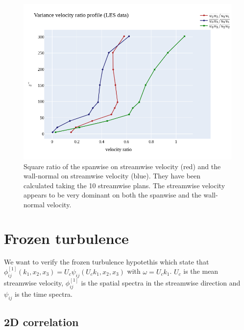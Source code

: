 \documentclass[]{article}
\theoremstyle{plain}
\theoremstyle{remark}
\begin{document}
\begin{figure}[H]
	\begin{center}
	\includegraphics[width=\textwidth]{../../output/figures/channel_wrles_retau395/split_time/RANS/velocity_ratio_profiles_all.png}
	\caption{Square ratio of the spanwise on streamwise velocity (red) and the wall-normal on streamwise velocity (blue). They have been calculated taking the 10 streamwise plans. The streamwise velocity appears to be very dominant on both the spanwise and the wall-normal velocity.}
	\end{center}
\end{figure}



\section{Frozen turbulence}

We want to verify the frozen turbulence hypotethis which state that $\phi_{ij}^{[1]}(k_1,x_2,x_3)=U_c\psi_{ij}(U_ck_1,x_2,x_3)$ with $\omega=U_ck_1$. $U_c$ is the mean streamwise velocity, $\phi_{ij}^{[1]}$ is the spatial spectra in the streamwise direction and $\psi_{ij}$ is the time spectra.

\subsection{2D correlation}
\end{document}
